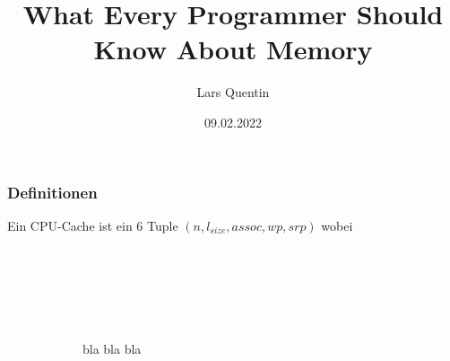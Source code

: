 \documentclass{beamer}
\title{What Every Programmer Should Know About Memory}
\author{Lars Quentin}
\date{09.02.2022}
\begin{document}
\frame{\titlepage}


\begin{frame}[t]
\frametitle{Definitionen}
Ein CPU-Cache ist ein 6 Tuple $(n, l_{size}, assoc, wp, srp)$ wobei
~\\~\\~\\~\\~\\~\\~\\
{\Huge
~~~~~~~~~~~~bla bla bla
}
\end{frame}
\end{document}
